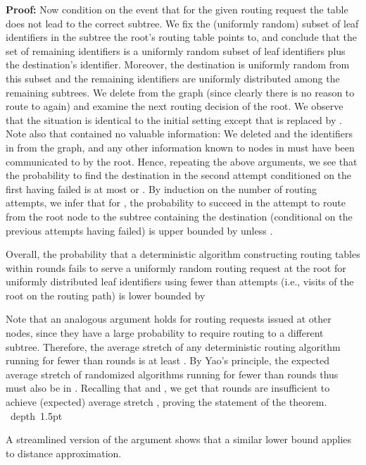 \documentclass[letterpaper,11pt]{article}
\newcommand{\blackslug}{\hbox{\hskip 1pt \vrule width 4pt height 8pt
depth 1.5pt \hskip 1pt}}
\newcommand{\QED}{\quad\blackslug\lower 8.5pt\null\par}
\newenvironment{proof}[1][Proof:]{\noindent \textbf{#1}\xspace}{\QED}
\begin{document}
\begin{proof}
Now condition on the event that for the given routing request the table
does not lead to the correct subtree. We fix the (uniformly random) subset of
leaf identifiers in the subtree  the root's routing table points to, and
conclude that the set of remaining identifiers is a uniformly random subset of
 leaf identifiers plus the destination's identifier. Moreover, the
destination is uniformly random from this subset and the remaining identifiers
are uniformly distributed among the remaining subtrees. We delete  from the
graph (since clearly there is no reason to route to  again) and examine the
next routing decision of the root. We observe that the situation is identical to
the initial setting except that  is replaced by . Note also that 
contained no valuable information: We deleted  and the identifiers in 
from the graph, and any other information known to nodes in  must have been
communicated to  by the root. Hence, repeating the above arguments, we see
that the probability to find the destination in the second attempt conditioned
on the first having failed is at most  or .
By induction on the number of routing attempts, we infer that for , the probability  to succeed in the  attempt to
route from the root node to the subtree containing the destination (conditional
on the previous attempts having failed) is upper bounded by  unless
.

Overall, the probability that a deterministic algorithm constructing routing
tables within  rounds fails to serve a uniformly random
routing request at the root for uniformly distributed leaf identifiers using
fewer than  attempts (i.e., visits of the root on the routing path) is
lower bounded by


Note that an analogous argument holds for routing requests issued at other
nodes, since they have a large probability to require routing to a different
subtree. Therefore, the average stretch of any deterministic routing
algorithm running for fewer than  rounds is at least
. By Yao's principle, the expected average stretch of randomized
algorithms running for fewer than  rounds thus must also be
in . Recalling that  and , we
get that  rounds are insufficient to achieve
(expected) average stretch , proving the statement of the theorem.
\end{proof}

A streamlined version of  the argument shows that a similar lower
bound applies to distance approximation.
\end{document}
